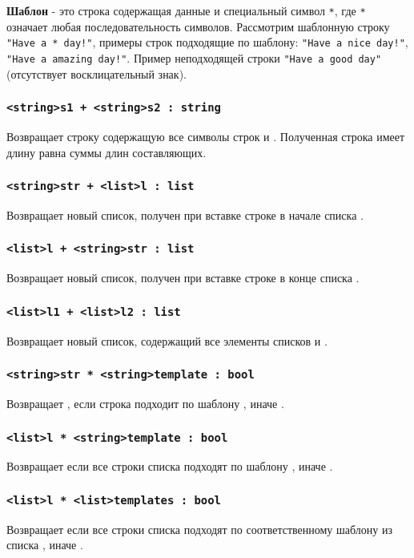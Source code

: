 \documentclass[a4paper, 14pt]{extarticle}
\begin{document}
{\bf Шаблон} - это строка содержащая данные и специальный символ \lstinline`*`, где \lstinline`*` означает любая последовательность символов. Рассмотрим шаблонную строку \lstinline`"Have a * day!"`, примеры строк подходящие по шаблону: \lstinline`"Have a nice day!"`, \lstinline`"Have a amazing day!"`. Пример неподходящей строки \lstinline`"Have a good day"` (отсутствует восклицательный знак).

\subsubsection{\lstinline`<string>s1 + <string>s2 : string`}
Возвращает строку содержащую все символы строк  и . Полученная строка имеет длину равна суммы длин составляющих.

\subsubsection{\lstinline`<string>str + <list>l : list`}
Возвращает новый список, получен при вставке строке  в начале списка .

\subsubsection{\lstinline`<list>l + <string>str : list`}
Возвращает новый список, получен при вставке строке  в конце списка .

\subsubsection{\lstinline`<list>l1 + <list>l2 : list`}
Возвращает новый список, содержащий все элементы списков  и .

\subsubsection{\lstinline`<string>str * <string>template : bool`}
Возвращает \true, если строка  подходит по шаблону , иначе \false.

\subsubsection{\lstinline`<list>l * <string>template : bool`}
Возвращает \true если все строки списка  подходят по шаблону , иначе \false.

\subsubsection{\lstinline`<list>l * <list>templates : bool`}
Возвращает \true если все строки списка  подходят по соответственному шаблону из списка , иначе \false.
\end{document}
